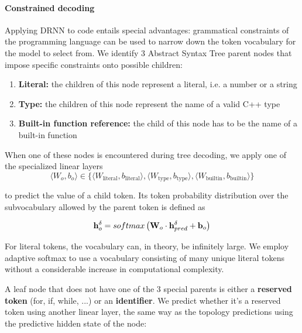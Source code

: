 \paragraph{Constrained decoding}
Applying DRNN \cite{alvarezmelis2017tree} to code entails special advantages: grammatical constraints of the programming language can be used to narrow down the token vocabulary for the model to select from.
We identify 3 Abstract Syntax Tree parent nodes that impose specific constraints onto possible children:

\begin{enumerate}
    \item \textbf{Literal:} the children of this node represent a literal, i.e. a number or a string
    \item \textbf{Type:} the children of this node represent the name of a valid C++ type
    \item \textbf{Built-in function reference:} the child of this node has to be the name of a built-in function
\end{enumerate}

When one of these nodes is encountered during tree decoding, we apply one of the specialized linear layers
\begin{equation}
\langle W_o,b_o \rangle \in \{\langle W_\text{literal},b_\text{literal} \rangle, \langle W_\text{type},b_\text{type} \rangle, \langle W_\text{builtin},b_\text{builtin} \rangle \}
\end{equation}

to predict the value of a child token. Its token probability distribution over the subvocabulary allowed by the parent token is defined as

\begin{align}
    \mathbf{h}_o^\delta =  softmax\left(\mathbf{W}_o \cdot \mathbf{h}_{pred}^\delta + \mathbf{b}_{o}\right) \label{eq:label_pred}
\end{align}

For literal tokens, the vocabulary can, in theory, be infinitely large. We employ adaptive softmax \cite{grave2017efficient} to use a vocabulary consisting of many unique literal tokens without a considerable increase in computational complexity.

A leaf node that does not have one of the 3 special parents is either a \textbf{reserved token} (for, if, while, ...) or an \textbf{identifier}. We predict whether it's a reserved token using another linear layer, the same way as the topology predictions using the predictive hidden state of the node: 

